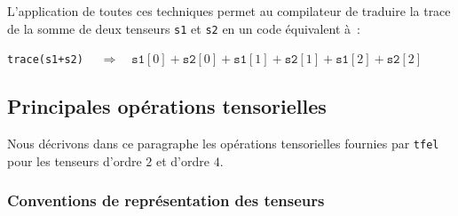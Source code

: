 \documentclass[rectoverso,pleiades,pstricks,leqno,anti]{texmf/note_technique_2010}
\newcommand{\tfel}{\texttt{tfel}}
\begin{document}
\begin{itemize}
  \begin{center}
    \begin{minipage}{0.8\textwidth}
      \mbox{}\\
      \hlstd{}\hlsym{$<$}\hlstd{}\hlsym{$>$}\hspace*{\fill}\\
      \hlsym{::}\hlsym{::}\hlsym{$<$}\hspace*{\fill}\\
      \hlstd{}\hlstd{\ \ }\hlsym{::}\hlsym{::}\hlsym{$<$}\hlsym{,}\hlsym{$>$::}\hlsym{,}\hspace*{\fill}\\
      \hlstd{}\hlstd{\ \ }\hlsym{$<$}\hlsym{$>$::}\hspace*{\fill}\\
      \hlsym{$>$::}\hspace*{\fill}\\
      \hlstd{}\hlsym{(}\hlstd{}\hlsym{\&);}\\
    \end{minipage}
  \end{center}

\end{itemize}

L'application de toutes ces techniques permet au compilateur de
traduire la trace de la somme de deux tenseurs \texttt{s1} et
\texttt{s2} en un code équivalent à~:
\begin{center}
  \texttt{trace(s1+s2)}
  \(\quad\Rightarrow\quad
  \texttt{s1}[0] + \texttt{s2}[0] +
  \texttt{s1}[1] + \texttt{s2}[1] +
  \texttt{s1}[2] + \texttt{s2}[2]
  \)
\end{center}
  
\subsection{Principales opérations tensorielles}

Nous décrivons dans ce paragraphe les opérations tensorielles fournies
par \tfel{} pour les tenseurs d'ordre \(2\) et d'ordre \(4\).

\subsubsection{Conventions de représentation des tenseurs}
\end{document}

